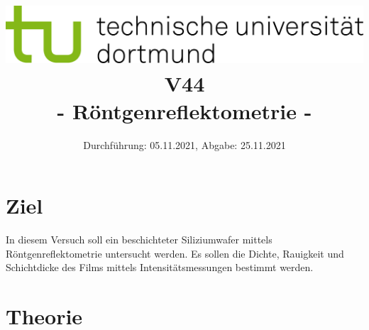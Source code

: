 
\usepackage{romannum}
\usepackage{listings}
\lstset{numbers=left, numberstyle=\tiny, numbersep=5pt}
\lstset{language=Perl}

\title{\includegraphics[scale=0.8]{../logo.jpg} \\ \vspace*{1cm} V44 \\ - Röntgenreflektometrie -}

\date{Durchführung: 05.11.2021, Abgabe: 25.11.2021}



\maketitle

\tableofcontents
\newpage

\section{Ziel}
In diesem Versuch soll ein beschichteter Siliziumwafer mittels Röntgenreflektometrie untersucht werden. Es sollen die Dichte, Rauigkeit und Schichtdicke des Films mittels Intensitätsmessungen bestimmt werden. %

\section{Theorie}
\label{sec:theorie}

